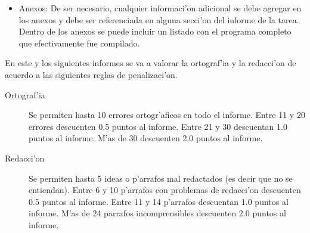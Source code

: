 \label{•} \documentclass[11pt]{utalcaDoc}
\begin{document}
\begin{itemize}
\item Anexos: De ser necesario, cualquier informaci'on adicional se debe
agregar en los anexos y debe ser referenciada en alguna secci'on del
informe de la tarea. Dentro de los anexos se puede incluir un listado con
el programa completo que efectivamente fue compilado.

\end{itemize}

En este y los siguientes informes se va a valorar la ortograf'ia y la
redacci'on de acuerdo a las siguientes reglas de penalizaci'on.

\begin{description}
\item[Ortograf'ia]
Se permiten hasta 10 errores ortogr'aficos en todo el informe.
Entre 11 y 20 errores descuenten 0.5 puntos al informe.
Entre 21 y 30 descuentan 1.0 puntos al informe.
M'as de 30 descuenten 2.0 puntos al informe.
\item[Redacci'on]
Se permiten hasta 5 ideas o p'arrafos mal redactados (es decir que no se entiendan).
Entre 6 y 10 p'arrafos con problemas de redacci'on descuenten 0.5 puntos al informe.
Entre 11 y 14 p'arrafos descuentan 1.0 puntos al informe.
M'as de 24 parrafos incomprensibles descuenten 2.0 puntos al informe.
\end{description}
\end{document}
